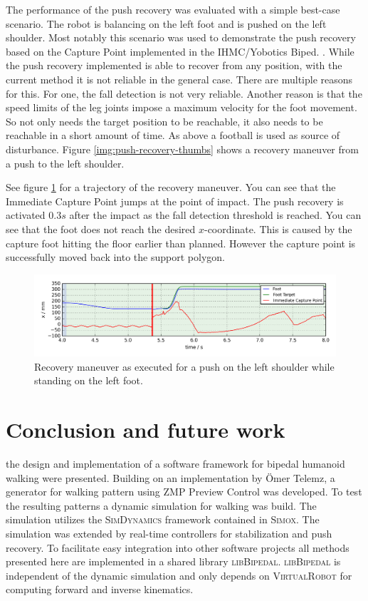 \documentclass[english,ngerman]{KITreprt}
\newcommand{\name}[1]{\textsc{#1}}
\begin{document}
The performance of the push recovery was evaluated with a simple
best-case scenario. The robot is balancing on the left foot and is
pushed on the left shoulder. Most notably this scenario was used to
demonstrate the push recovery based on the Capture Point implemented in
the IHMC/Yobotics Biped. \cite{pratt2009video}. While the push recovery
implemented is able to recover from any position, with the current
method it is not reliable in the general case. There are multiple
reasons for this. For one, the fall detection is not very reliable.
Another reason is that the speed limits of the leg joints impose a
maximum velocity for the foot movement. So not only needs the target
position to be reachable, it also needs to be reachable in a short
amount of time. As above a football is used as source of disturbance.
Figure \ref{img:push-recovery-thumbs} shows a recovery maneuver from a
push to the left shoulder.

See figure \ref{img:push-recovery-x} for a trajectory of the recovery
maneuver. You can see that the Immediate Capture Point jumps at the
point of impact. The push recovery is activated $0.3s$ after the impact
as the fall detection threshold is reached. You can see that the foot
does not reach the desired $x$-coordinate. This is caused by the capture
foot hitting the floor earlier than planned. However the capture point
is successfully moved back into the support polygon.

\begin{figure}[hbt]
\vspace*{-1em}
\includegraphics[width=\textwidth,resolution=300]{images/push_recovery_x.png}
\caption{Recovery maneuver as executed for a push on the left shoulder while standing on the left foot.}
\label{img:push-recovery-x}
\end{figure}

\chapter{Conclusion and future work}\label{conclusion-and-future-work}

the design and implementation of a software framework for bipedal
humanoid walking were presented. Building on an implementation by Ömer
Telemz, a generator for walking pattern using ZMP Preview Control was
developed. To test the resulting patterns a dynamic simulation for
walking was build. The simulation utilizes the \name{SimDynamics}
framework contained in \name{Simox}. The simulation was extended by
real-time controllers for stabilization and push recovery. To facilitate
easy integration into other software projects all methods presented here
are implemented in a shared library \name{libBipedal}. \name{libBipedal}
is independent of the dynamic simulation and only depends on
\name{VirtualRobot} for computing forward and inverse kinematics.
\end{document}
